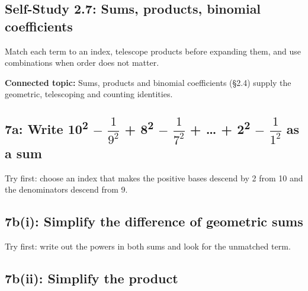 \documentclass[11pt]{article}
\begin{document}
\begin{keepsection}
\section{Self-Study 2.7: Sums, products, binomial coefficients}

Match each term to an index, telescope products before expanding them, and use combinations when order does not matter.

\textbf{Connected topic:} Sums, products and binomial coefficients (§2.4) supply the geometric, telescoping and counting identities.

\begin{keepsection}
\subsection{7a: Write 10\textsuperscript{2} \ensuremath{-} {\small\ensuremath{\dfrac{1}{9^{2}}}} + 8\textsuperscript{2} \ensuremath{-} {\small\ensuremath{\dfrac{1}{7^{2}}}} + … + 2\textsuperscript{2} \ensuremath{-} {\small\ensuremath{\dfrac{1}{1^{2}}}} as a sum}

Try first: choose an index that makes the positive bases descend by 2 from 10 and the denominators descend from 9.

\end{keepsection}

\begin{keepsection}
\subsection{7b(i): Simplify the difference of geometric sums}

Try first: write out the powers in both sums and look for the unmatched term.

\end{keepsection}

\begin{keepsection}
\subsection{7b(ii): Simplify the product}


\end{keepsection}
\end{keepsection}
\end{document}
